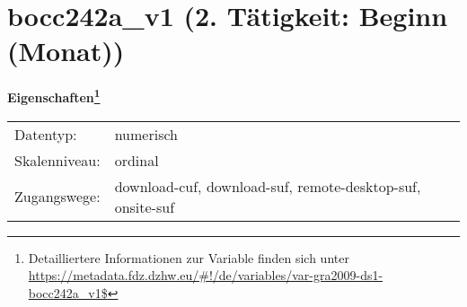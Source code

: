 
    \setcounter{footnote}{0}

    \vspace*{-1.8cm}
	\section{bocc242a\_v1 (2. Tätigkeit: Beginn (Monat))}
	\label{section:bocc242a_v1}



    \vspace*{0.5cm}
    \noindent\textbf{Eigenschaften\footnote{Detailliertere Informationen zur Variable finden sich unter
		\url{https://metadata.fdz.dzhw.eu/\#!/de/variables/var-gra2009-ds1-bocc242a_v1$}}}\\
	\begin{tabularx}{\hsize}{@{}lX}
	Datentyp: & numerisch \\
	Skalenniveau: & ordinal \\
	Zugangswege: &
	  download-cuf, 
	  download-suf, 
	  remote-desktop-suf, 
	  onsite-suf
 \\
    \end{tabularx}



